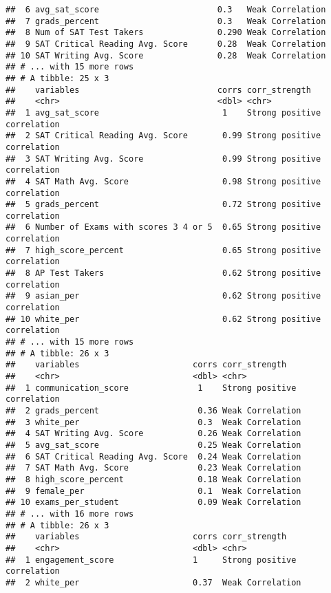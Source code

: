 \documentclass[]{article}
\begin{document}
\begin{verbatim}
##  6 avg_sat_score                        0.3   Weak Correlation           
##  7 grads_percent                        0.3   Weak Correlation           
##  8 Num of SAT Test Takers               0.290 Weak Correlation           
##  9 SAT Critical Reading Avg. Score      0.28  Weak Correlation           
## 10 SAT Writing Avg. Score               0.28  Weak Correlation           
## # ... with 15 more rows
## # A tibble: 25 x 3
##    variables                            corrs corr_strength              
##    <chr>                                <dbl> <chr>                      
##  1 avg_sat_score                         1    Strong positive correlation
##  2 SAT Critical Reading Avg. Score       0.99 Strong positive correlation
##  3 SAT Writing Avg. Score                0.99 Strong positive correlation
##  4 SAT Math Avg. Score                   0.98 Strong positive correlation
##  5 grads_percent                         0.72 Strong positive correlation
##  6 Number of Exams with scores 3 4 or 5  0.65 Strong positive correlation
##  7 high_score_percent                    0.65 Strong positive correlation
##  8 AP Test Takers                        0.62 Strong positive correlation
##  9 asian_per                             0.62 Strong positive correlation
## 10 white_per                             0.62 Strong positive correlation
## # ... with 15 more rows
## # A tibble: 26 x 3
##    variables                       corrs corr_strength              
##    <chr>                           <dbl> <chr>                      
##  1 communication_score              1    Strong positive correlation
##  2 grads_percent                    0.36 Weak Correlation           
##  3 white_per                        0.3  Weak Correlation           
##  4 SAT Writing Avg. Score           0.26 Weak Correlation           
##  5 avg_sat_score                    0.25 Weak Correlation           
##  6 SAT Critical Reading Avg. Score  0.24 Weak Correlation           
##  7 SAT Math Avg. Score              0.23 Weak Correlation           
##  8 high_score_percent               0.18 Weak Correlation           
##  9 female_per                       0.1  Weak Correlation           
## 10 exams_per_student                0.09 Weak Correlation           
## # ... with 16 more rows
## # A tibble: 26 x 3
##    variables                       corrs corr_strength              
##    <chr>                           <dbl> <chr>                      
##  1 engagement_score                1     Strong positive correlation
##  2 white_per                       0.37  Weak Correlation           

\end{verbatim}
\end{document}
